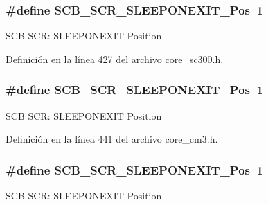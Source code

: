 \subsubsection[{\texorpdfstring{S\+C\+B\+\_\+\+S\+C\+R\+\_\+\+S\+L\+E\+E\+P\+O\+N\+E\+X\+I\+T\+\_\+\+Pos}{SCB_SCR_SLEEPONEXIT_Pos}}]{\setlength{\rightskip}{0pt plus 5cm}\#define S\+C\+B\+\_\+\+S\+C\+R\+\_\+\+S\+L\+E\+E\+P\+O\+N\+E\+X\+I\+T\+\_\+\+Pos~1}\hypertarget{group___c_m_s_i_s___s_c_b_ga3680a15114d7fdc1e25043b881308fe9}{}\label{group___c_m_s_i_s___s_c_b_ga3680a15114d7fdc1e25043b881308fe9}
S\+CB S\+CR\+: S\+L\+E\+E\+P\+O\+N\+E\+X\+IT Position 

Definición en la línea 427 del archivo core\+\_\+sc300.\+h.

\subsubsection[{\texorpdfstring{S\+C\+B\+\_\+\+S\+C\+R\+\_\+\+S\+L\+E\+E\+P\+O\+N\+E\+X\+I\+T\+\_\+\+Pos}{SCB_SCR_SLEEPONEXIT_Pos}}]{\setlength{\rightskip}{0pt plus 5cm}\#define S\+C\+B\+\_\+\+S\+C\+R\+\_\+\+S\+L\+E\+E\+P\+O\+N\+E\+X\+I\+T\+\_\+\+Pos~1}\hypertarget{group___c_m_s_i_s___s_c_b_ga3680a15114d7fdc1e25043b881308fe9}{}\label{group___c_m_s_i_s___s_c_b_ga3680a15114d7fdc1e25043b881308fe9}
S\+CB S\+CR\+: S\+L\+E\+E\+P\+O\+N\+E\+X\+IT Position 

Definición en la línea 441 del archivo core\+\_\+cm3.\+h.

\subsubsection[{\texorpdfstring{S\+C\+B\+\_\+\+S\+C\+R\+\_\+\+S\+L\+E\+E\+P\+O\+N\+E\+X\+I\+T\+\_\+\+Pos}{SCB_SCR_SLEEPONEXIT_Pos}}]{\setlength{\rightskip}{0pt plus 5cm}\#define S\+C\+B\+\_\+\+S\+C\+R\+\_\+\+S\+L\+E\+E\+P\+O\+N\+E\+X\+I\+T\+\_\+\+Pos~1}\hypertarget{group___c_m_s_i_s___s_c_b_ga3680a15114d7fdc1e25043b881308fe9}{}\label{group___c_m_s_i_s___s_c_b_ga3680a15114d7fdc1e25043b881308fe9}
S\+CB S\+CR\+: S\+L\+E\+E\+P\+O\+N\+E\+X\+IT Position 

